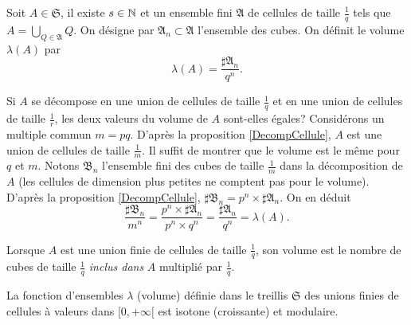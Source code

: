\begin{defi}
Soit $A \in \mathfrak{S}$, il existe $s\in \mathbb{N}$ et un ensemble fini $\mathfrak{A}$ de cellules de taille $\frac{1}{q}$ tels que $A = \bigcup_{Q\in \mathfrak{A}} Q$. On désigne par $\mathfrak{A}_n \subset \mathfrak{A}$ l'ensemble des cubes. On définit le volume $\lambda(A)$ par
\begin{displaymath}
 \lambda(A) = \frac{\sharp \mathfrak{A}_n}{q^{n}}.
\end{displaymath}
\end{defi}
\begin{demo}
 Si $A$ se décompose en une union de cellules de taille $\frac{1}{q}$ et en une union de cellules de taille $\frac{1}{r}$, les deux valeurs du volume de $A$ sont-elles égales?\newline
 Considérons un multiple commun $m=pq$. D'après la proposition \ref{DecompCellule}, $A$ est une union de cellules de taille $\frac{1}{m}$. Il suffit de montrer que le volume est le même pour $q$ et $m$.\newline
 Notons $\mathfrak{B}_n$ l'ensemble fini des cubes de taille $\frac{1}{m}$ dans la décomposition de $A$ (les cellules de dimension plus petites ne comptent pas pour le volume). D'après la proposition \ref{DecompCellule}, $\sharp \mathfrak{B}_n = p^n \times \sharp \mathfrak{A}_n$. On en déduit
 \begin{displaymath}
  \frac{\sharp \mathfrak{B}_n}{m^{n}} = \frac{p^n \times \sharp \mathfrak{A}_n}{p^n \times q^{n}} = \frac{\sharp \mathfrak{A}_n}{q^{n}} = \lambda(A).
 \end{displaymath}
\end{demo}
\begin{rem}
 Lorsque $A$ est une union finie de cellules de taille $\frac{1}{q}$, son volume est le nombre de cubes de taille $\frac{1}{q}$ \emph{inclus dans } $A$ multiplié par $\frac{1}{q}$.
\end{rem}
\begin{propn}
 La fonction d'ensembles $\lambda$ (volume) définie dans le treillis $\mathfrak{S}$ des unions finies de cellules à valeurs dans $[0,+\infty[$ est isotone (croissante) et modulaire.
\end{propn}
